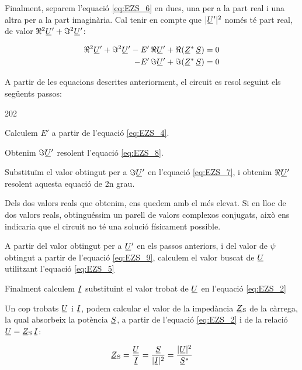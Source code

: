 Finalment, separem l'equació \eqref{eq:EZS_6} en dues, una per a la part real i una altra per a la part imaginària. Cal tenir en compte que $|\cmplx{U}'|^2$ només té part real, de valor $\Re^2\cmplx{U}' + \Im^2\cmplx{U}'$:

\begin{align}
   \Re^2\cmplx{U}' + \Im^2\cmplx{U}' - E' \, \Re\cmplx{U}' + \Re(\cmplx{Z}^* \, \cmplx{S}) &= 0 \label{eq:EZS_7} \\
   - E' \, \Im\cmplx{U}' + \Im(\cmplx{Z}^* \, \cmplx{S}) &= 0 \label{eq:EZS_8}
\end{align}

A partir de les equacions descrites anteriorment, el circuit es resol seguint els següents passos:
\begin{dingautolist}{202}
   \item Calculem $E'$ a partir de l'equació \eqref{eq:EZS_4}.
   \item Obtenim $\Im\cmplx{U}'$ resolent l'equació \eqref{eq:EZS_8}.
   \item Substituïm el valor obtingut per a $\Im\cmplx{U}'$ en l'equació \eqref{eq:EZS_7}, i obtenim $\Re\cmplx{U}'$ resolent aquesta equació de 2n grau.
   \item Dels dos valors reals que obtenim, ens quedem amb el més elevat. Si en lloc de dos valors reals, obtinguéssim un parell de valors  complexos conjugats, això ens indicaria que el circuit no té una solució físicament possible.
   \item A partir del valor  obtingut per a $\cmplx{U}'$ en els passos anteriors, i del valor de $\psi$ obtingut a partir de l'equació \eqref{eq:EZS_9}, calculem el valor buscat de $\cmplx{U}$ utilitzant l'equació \eqref{eq:EZS_5}
   \item Finalment calculem $\cmplx{I}$ substituint el valor trobat de $\cmplx{U}$ en l'equació \eqref{eq:EZS_2}
\end{dingautolist}

Un cop trobats $\cmplx{U}$ i $\cmplx{I}$, podem calcular el valor de
la impedància  $\cmplx{Z}\ped{S}$ de la càrrega, la qual absorbeix
la potència $\cmplx{S}$, a partir de l'equació \eqref{eq:EZS_2} i de
la relació $\cmplx{U} = \cmplx{Z}\ped{S} \,\cmplx{I}$:

\begin{equation}
   \cmplx{Z}\ped{S} = \frac{\cmplx{U}}{\cmplx{I}} =
   \frac{\cmplx{S}}{|\cmplx{I}|^2} =
   \frac{|\cmplx{U}|^2}{\cmplx{S}^*} \label{eq:EZS 10}
\end{equation}


